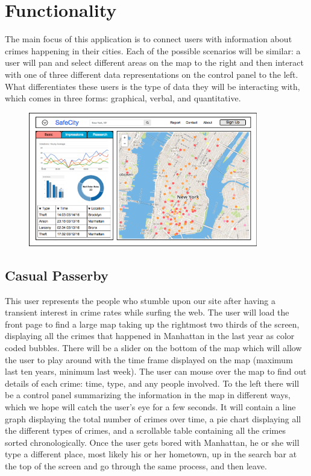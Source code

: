 \documentclass[paper=a4, fontsize=11pt]{scrartcl} %
\numberwithin{equation}{section} %
\numberwithin{figure}{section} %
\numberwithin{table}{section} %
\begin{document}

\section{Functionality}

The main focus of this application is to connect users with information about crimes happening in their cities. Each of the possible scenarios will be similar: a user will pan and select different areas on the map to the right and then interact with one of three different data representations on the control panel to the left. What differentiates these users is the type of data they will be interacting with, which comes in three forms: graphical, verbal, and quantitative.  \\

\begin{figure}[h]
\includegraphics[width=10cm]{mockup}
\centering
\end{figure}


\subsection{Casual Passerby}

This user represents the people who stumble upon our site after having a transient interest in crime rates while surfing the web. The user will load the front page to find a large map taking up the rightmost two thirds of the screen, displaying all the crimes that happened in Manhattan in the last year as color coded bubbles. There will be a slider on the bottom of the map which will allow the user to play around with the time frame displayed on the map (maximum last ten years, minimum last week). The user can mouse over the map to find out details of each crime: time, type, and any people involved. To the left there will be a control panel summarizing the information in the map in different ways, which we hope will catch the user's eye for a few seconds. It will contain a line graph displaying the total number of crimes over time, a pie chart displaying all the different types of crimes, and a scrollable table containing all the crimes sorted chronologically. Once the user gets bored with Manhattan, he or she will type a different place, most likely his or her hometown, up in the search bar at the top of the screen and go through the same process, and then leave.
\end{document}
